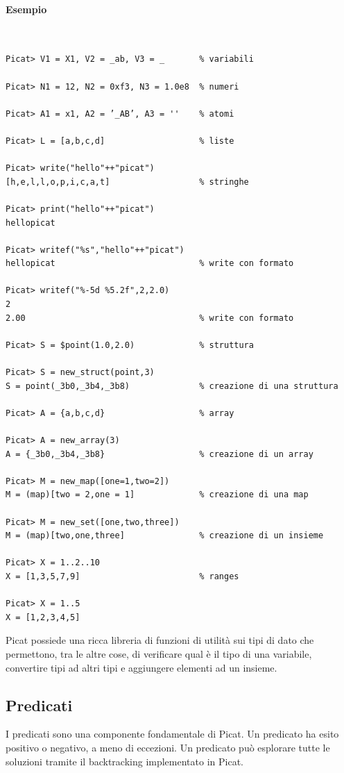 \documentclass[12pt,a4paper,openright]{book} %
\begin{document}
\paragraph{Esempio}\
\begin{verbatim}
Picat> V1 = X1, V2 = _ab, V3 = _       % variabili

Picat> N1 = 12, N2 = 0xf3, N3 = 1.0e8  % numeri

Picat> A1 = x1, A2 = ’_AB’, A3 = ''    % atomi

Picat> L = [a,b,c,d]                   % liste

Picat> write("hello"++"picat")
[h,e,l,l,o,p,i,c,a,t]                  % stringhe

Picat> print("hello"++"picat")
hellopicat

Picat> writef("%s","hello"++"picat")
hellopicat                             % write con formato

Picat> writef("%-5d %5.2f",2,2.0)
2
2.00                                   % write con formato

Picat> S = $point(1.0,2.0)             % struttura

Picat> S = new_struct(point,3)
S = point(_3b0,_3b4,_3b8)              % creazione di una struttura

Picat> A = {a,b,c,d}                   % array

Picat> A = new_array(3)
A = {_3b0,_3b4,_3b8}                   % creazione di un array

Picat> M = new_map([one=1,two=2])
M = (map)[two = 2,one = 1]             % creazione di una map

Picat> M = new_set([one,two,three])
M = (map)[two,one,three]               % creazione di un insieme

Picat> X = 1..2..10
X = [1,3,5,7,9]                        % ranges

Picat> X = 1..5
X = [1,2,3,4,5]
\end{verbatim}

Picat possiede una ricca libreria di funzioni di utilità sui tipi di dato che permettono, tra le altre cose, di verificare qual è il tipo di una variabile, convertire tipi ad altri tipi e aggiungere elementi ad un insieme.

\subsection{Predicati}
\label{sec:picat_base_pred}

I predicati sono una componente fondamentale di Picat. Un predicato ha esito positivo o negativo, a meno di eccezioni. Un predicato può esplorare tutte le soluzioni tramite il backtracking implementato in Picat.
\end{document}

